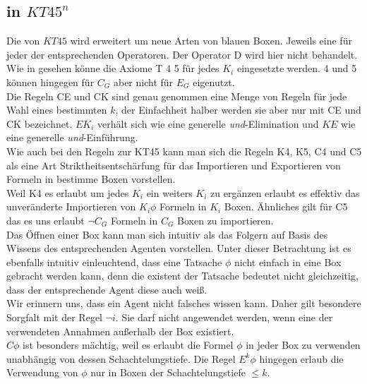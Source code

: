 \subsection{\ND in $KT45^n$}
Die \ND von $KT45$ wird erweitert um neue Arten von blauen Boxen.
Jeweils eine für jeder der entsprechenden Operatoren.
Der Operator D wird hier nicht behandelt.\\
Wie in  gesehen könne die Axiome T 4 5 für jedes $K_i$ eingesetzte werden. 4 und 5 können hingegen für $C_G$ aber nicht für $E_G$ eigenutzt.\\
Die Regeln CE und CK sind genau genommen eine Menge von Regeln für jede Wahl eines bestimmten $k$, der Einfachheit halber werden sie aber nur mit CE und CK bezeichnet.
$EK_i$ verhält sich wie eine generelle \emph{und}-Elimination und $KE$ wie eine generelle \emph{und}-Einführung.\\
Wie auch bei den Regeln zur KT45 kann man sich die Regeln K4, K5, C4 und C5 als eine Art Striktheitsentschärfung für das Importieren und Exportieren von Formeln in bestimme Boxen vorstellen.\\
Weil K4 es erlaubt um jedes $K_i$ ein weiters $K_i$ zu ergänzen erlaubt es effektiv das unveränderte Importieren von $K_i \phi$ Formeln in $K_i$ Boxen.
Ähnliches gilt für C5 das es uns erlaubt $\neg C_G$ Formeln in $C_G$ Boxen zu importieren.\\
Das Öffnen einer Box kann man sich intuitiv als das Folgern auf Basis des Wissens des entsprechenden Agenten vorstellen.
Unter dieser Betrachtung ist es ebenfalls intuitiv einleuchtend, dass eine Tatsache $\phi$ nicht einfach in eine Box gebracht werden kann, denn die existent der Tatsache bedeutet nicht gleichzeitig, dass der entsprechende Agent diese auch weiß.\\
Wir erinnern uns, dass ein Agent nicht falsches wissen kann.
Daher gilt besondere Sorgfalt mit der Regel $\neg i$.
Sie darf nicht angewendet werden, wenn eine der verwendeten Annahmen außerhalb der Box existiert.\\
$C\phi$ ist besonders mächtig, weil es erlaubt die Formel $\phi$ in jeder Box zu verwenden unabhängig von dessen Schachtelungstiefe.
Die Regel $E^k \phi$ hingegen erlaub die Verwendung von $\phi$ nur in Boxen der Schachtelungstiefe $\leq k$.





